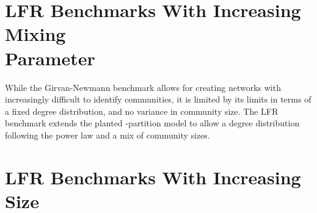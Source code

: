 \section{LFR Benchmarks With Increasing Mixing \\ Parameter}
While the Girvan-Newmann benchmark allows for creating networks with increasingly difficult to identify communities, it is limited by its limits in terms of a fixed degree distribution, and no variance in community size. The LFR benchmark extends the planted -partition model to allow a degree distribution following the power law and a mix of community sizes.

\section{LFR Benchmarks With Increasing Size}
